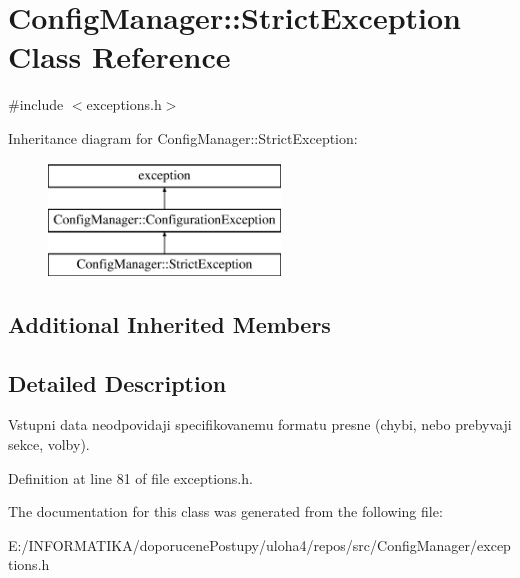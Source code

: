 \hypertarget{class_config_manager_1_1_strict_exception}{}\section{Config\+Manager\+:\+:Strict\+Exception Class Reference}
\label{class_config_manager_1_1_strict_exception}


{\ttfamily \#include $<$exceptions.\+h$>$}

Inheritance diagram for Config\+Manager\+:\+:Strict\+Exception\+:\begin{figure}[H]
\begin{center}
\leavevmode
\includegraphics[height=3.000000cm]{class_config_manager_1_1_strict_exception}
\end{center}
\end{figure}
\subsection*{Additional Inherited Members}


\subsection{Detailed Description}
Vstupni data neodpovidaji specifikovanemu formatu presne (chybi, nebo prebyvaji sekce, volby). 

Definition at line 81 of file exceptions.\+h.



The documentation for this class was generated from the following file\+:\begin{DoxyCompactItemize}
\item 
E\+:/\+I\+N\+F\+O\+R\+M\+A\+T\+I\+K\+A/doporucene\+Postupy/uloha4/repos/src/\+Config\+Manager/exceptions.\+h\end{DoxyCompactItemize}
